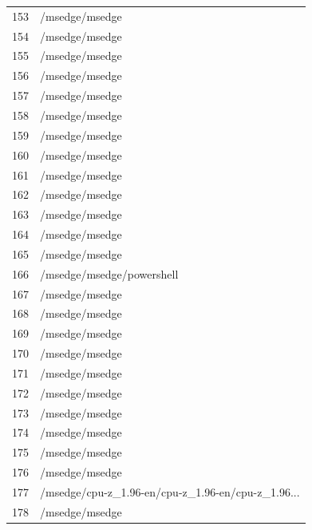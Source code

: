 \documentclass[a4paper,twoside,12pt]{book}
\begin{document}
\begin{appendices}
\begin{table}
\begin{tabular}{ll}
		153 &                                     /msedge/msedge \\
		154 &                                     /msedge/msedge \\
		155 &                                     /msedge/msedge \\
		156 &                                     /msedge/msedge \\
		157 &                                     /msedge/msedge \\
		158 &                                     /msedge/msedge \\
		159 &                                     /msedge/msedge \\
		160 &                                     /msedge/msedge \\
		161 &                                     /msedge/msedge \\
		162 &                                     /msedge/msedge \\
		163 &                                     /msedge/msedge \\
		164 &                                     /msedge/msedge \\
		165 &                                     /msedge/msedge \\
		166 &                          /msedge/msedge/powershell \\
		167 &                                     /msedge/msedge \\
		168 &                                     /msedge/msedge \\
		169 &                                     /msedge/msedge \\
		170 &                                     /msedge/msedge \\
		171 &                                     /msedge/msedge \\
		172 &                                     /msedge/msedge \\
		173 &                                     /msedge/msedge \\
		174 &                                     /msedge/msedge \\
		175 &                                     /msedge/msedge \\
		176 &                                     /msedge/msedge \\
		177 &  /msedge/cpu-z\_1.96-en/cpu-z\_1.96-en/cpu-z\_1.96... \\
		178 &                                     /msedge/msedge \\

\end{tabular}
\end{table}
\end{appendices}
\end{document}
